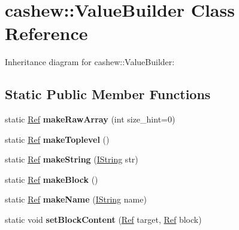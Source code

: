\hypertarget{classcashew_1_1_value_builder}{}\section{cashew\+:\+:Value\+Builder Class Reference}
\label{classcashew_1_1_value_builder}


Inheritance diagram for cashew\+:\+:Value\+Builder\+:
\subsection*{Static Public Member Functions}
\begin{DoxyCompactItemize}
\item 
\mbox{\label{classcashew_1_1_value_builder_a355c69e4932b1b2f6963c10b7db80762}} 
static \mbox{\hyperlink{structcashew_1_1_ref}{Ref}} {\bfseries make\+Raw\+Array} (int size\+\_\+hint=0)
\item 
\mbox{\label{classcashew_1_1_value_builder_ab1db5d1c1681670c8388a138aca043d5}} 
static \mbox{\hyperlink{structcashew_1_1_ref}{Ref}} {\bfseries make\+Toplevel} ()
\item 
\mbox{\label{classcashew_1_1_value_builder_a83b5221e558c9388fc8294e3e0d55f3e}} 
static \mbox{\hyperlink{structcashew_1_1_ref}{Ref}} {\bfseries make\+String} (\mbox{\hyperlink{structcashew_1_1_i_string}{I\+String}} str)
\item 
\mbox{\label{classcashew_1_1_value_builder_a82c7f03a22f087d77f0b1551078b22a2}} 
static \mbox{\hyperlink{structcashew_1_1_ref}{Ref}} {\bfseries make\+Block} ()
\item 
\mbox{\label{classcashew_1_1_value_builder_ae793d2523d7e872b2bfe70d7edadab49}} 
static \mbox{\hyperlink{structcashew_1_1_ref}{Ref}} {\bfseries make\+Name} (\mbox{\hyperlink{structcashew_1_1_i_string}{I\+String}} name)
\item 
\mbox{\label{classcashew_1_1_value_builder_a067970851879bec816bf12ca6d0188e0}} 
static void {\bfseries set\+Block\+Content} (\mbox{\hyperlink{structcashew_1_1_ref}{Ref}} target, \mbox{\hyperlink{structcashew_1_1_ref}{Ref}} block)

\end{DoxyCompactItemize}
